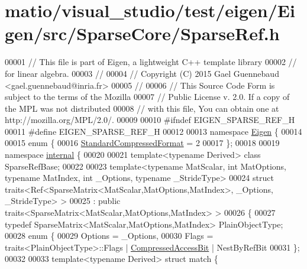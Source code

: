 \hypertarget{matio_2visual__studio_2test_2eigen_2_eigen_2src_2_sparse_core_2_sparse_ref_8h_source}{}\section{matio/visual\+\_\+studio/test/eigen/\+Eigen/src/\+Sparse\+Core/\+Sparse\+Ref.h}
\label{matio_2visual__studio_2test_2eigen_2_eigen_2src_2_sparse_core_2_sparse_ref_8h_source}

\begin{DoxyCode}
00001 \textcolor{comment}{// This file is part of Eigen, a lightweight C++ template library}
00002 \textcolor{comment}{// for linear algebra.}
00003 \textcolor{comment}{//}
00004 \textcolor{comment}{// Copyright (C) 2015 Gael Guennebaud <gael.guennebaud@inria.fr>}
00005 \textcolor{comment}{//}
00006 \textcolor{comment}{// This Source Code Form is subject to the terms of the Mozilla}
00007 \textcolor{comment}{// Public License v. 2.0. If a copy of the MPL was not distributed}
00008 \textcolor{comment}{// with this file, You can obtain one at http://mozilla.org/MPL/2.0/.}
00009 
00010 \textcolor{preprocessor}{#ifndef EIGEN\_SPARSE\_REF\_H}
00011 \textcolor{preprocessor}{#define EIGEN\_SPARSE\_REF\_H}
00012 
00013 \textcolor{keyword}{namespace }\hyperlink{namespace_eigen}{Eigen} \{
00014 
00015 \textcolor{keyword}{enum} \{
00016   \hyperlink{namespace_eigen_a668ffb0fb66c55c1c98bd35c52df648eaf81fc519ed9cc0ebc6aac69a366086a5}{StandardCompressedFormat} = 2 
00017 \};
00018   
00019 \textcolor{keyword}{namespace }\hyperlink{namespaceinternal}{internal} \{
00020 
00021 \textcolor{keyword}{template}<\textcolor{keyword}{typename} Derived> \textcolor{keyword}{class }SparseRefBase;
00022 
00023 \textcolor{keyword}{template}<\textcolor{keyword}{typename} MatScalar, \textcolor{keywordtype}{int} MatOptions, \textcolor{keyword}{typename} MatIndex, \textcolor{keywordtype}{int} \_Options, \textcolor{keyword}{typename} \_Str\textcolor{keywordtype}{id}eType>
00024 \textcolor{keyword}{struct }traits<Ref<SparseMatrix<MatScalar,MatOptions,MatIndex>, \_Options, \_StrideType> >
00025   : \textcolor{keyword}{public} traits<SparseMatrix<MatScalar,MatOptions,MatIndex> >
00026 \{
00027   \textcolor{keyword}{typedef} SparseMatrix<MatScalar,MatOptions,MatIndex> PlainObjectType;
00028   \textcolor{keyword}{enum} \{
00029     Options = \_Options,
00030     Flags = traits<PlainObjectType>::Flags | \hyperlink{group__flags_gaed0244284da47a2b8661261431173caf}{CompressedAccessBit} | NestByRefBit
00031   \};
00032 
00033   \textcolor{keyword}{template}<\textcolor{keyword}{typename} Derived> \textcolor{keyword}{struct }match \{

\end{DoxyCode}
